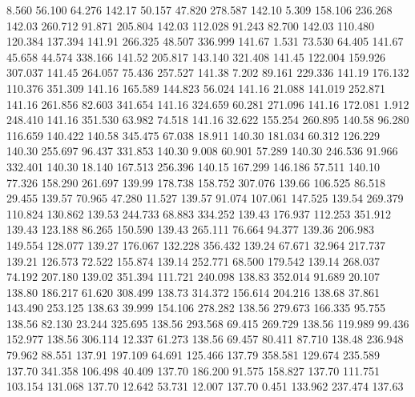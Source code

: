    8.560   56.100   64.276       142.17
  50.157   47.820  278.587       142.10
   5.309  158.106  236.268       142.03
 260.712   91.871  205.804       142.03
 112.028   91.243   82.700       142.03
 110.480  120.384  137.394       141.91
 266.325   48.507  336.999       141.67
   1.531   73.530   64.405       141.67
  45.658   44.574  338.166       141.52
 205.817  143.140  321.408       141.45
 122.004  159.926  307.037       141.45
 264.057   75.436  257.527       141.38
   7.202   89.161  229.336       141.19
 176.132  110.376  351.309       141.16
 165.589  144.823   56.024       141.16
  21.088  141.019  252.871       141.16
 261.856   82.603  341.654       141.16
 324.659   60.281  271.096       141.16
 172.081    1.912  248.410       141.16
 351.530   63.982   74.518       141.16
  32.622  155.254  260.895       140.58
  96.280  116.659  140.422       140.58
 345.475   67.038   18.911       140.30
 181.034   60.312  126.229       140.30
 255.697   96.437  331.853       140.30
   9.008   60.901   57.289       140.30
 246.536   91.966  332.401       140.30
  18.140  167.513  256.396       140.15
 167.299  146.186   57.511       140.10
  77.326  158.290  261.697       139.99
 178.738  158.752  307.076       139.66
 106.525   86.518   29.455       139.57
  70.965   47.280   11.527       139.57
  91.074  107.061  147.525       139.54
 269.379  110.824  130.862       139.53
 244.733   68.883  334.252       139.43
 176.937  112.253  351.912       139.43
 123.188   86.265  150.590       139.43
 265.111   76.664   94.377       139.36
 206.983  149.554  128.077       139.27
 176.067  132.228  356.432       139.24
  67.671   32.964  217.737       139.21
 126.573   72.522  155.874       139.14
 252.771   68.500  179.542       139.14
 268.037   74.192  207.180       139.02
 351.394  111.721  240.098       138.83
 352.014   91.689   20.107       138.80
 186.217   61.620  308.499       138.73
 314.372  156.614  204.216       138.68
  37.861  143.490  253.125       138.63
  39.999  154.106  278.282       138.56
 279.673  166.335   95.755       138.56
  82.130   23.244  325.695       138.56
 293.568   69.415  269.729       138.56
 119.989   99.436  152.977       138.56
 306.114   12.337   61.273       138.56
  69.457   80.411   87.710       138.48
 236.948   79.962   88.551       137.91
 197.109   64.691  125.466       137.79
 358.581  129.674  235.589       137.70
 341.358  106.498   40.409       137.70
 186.200   91.575  158.827       137.70
 111.751  103.154  131.068       137.70
  12.642   53.731   12.007       137.70
   0.451  133.962  237.474       137.63
